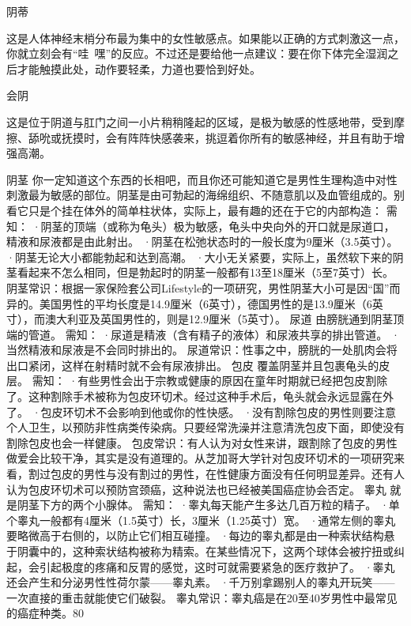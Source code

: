 \documentclass[12pt,UTF8]{ctexbook}
\begin{document}
阴蒂

这是人体神经末梢分布最为集中的女性敏感点。如果能以正确的方式刺激这一点，你就立刻会有“哇~嘿”的反应。不过还是要给他一点建议：要在你下体完全湿润之后才能触摸此处，动作要轻柔，力道也要恰到好处。

会阴

这是位于阴道与肛门之间一小片稍稍隆起的区域，是极为敏感的性感地带，受到摩擦、舔吮或抚摸时，会有阵阵快感袭来，挑逗着你所有的敏感神经，并且有助于增强高潮。


阴茎
你一定知道这个东西的长相吧，而且你还可能知道它是男性生理构造中对性刺激最为敏感的部位。阴茎是由可勃起的海绵组织、不随意肌以及血管组成的。别看它只是个挂在体外的简单柱状体，实际上，最有趣的还在于它的内部构造：
需知：
·阴茎的顶端（或称为龟头）极为敏感，龟头中央向外的开口就是尿道口，精液和尿液都是由此射出。
·阴茎在松弛状态时的一般长度为9厘米（3.5英寸）。
·阴茎无论大小都能勃起和达到高潮。
·大小无关紧要，实际上，虽然软下来的阴茎看起来不怎么相同，但是勃起时的阴茎一般都有13至18厘米（5至7英寸）长。
阴茎常识：根据一家保险套公司Lifestyle的一项研究，男性阴茎大小可是因“国”而异的。美国男性的平均长度是14.9厘米（6英寸），德国男性的是13.9厘米（6英寸），而澳大利亚及英国男性的，则是12.9厘米（5英寸）。
尿道
由膀胱通到阴茎顶端的管道。
需知：
·尿道是精液（含有精子的液体）和尿液共享的排出管道。
·当然精液和尿液是不会同时排出的。
尿道常识：性事之中，膀胱的一处肌肉会将出口紧闭，这样在射精时就不会有尿液排出。
包皮
覆盖阴茎并且包裹龟头的皮层。
需知：
·有些男性会出于宗教或健康的原因在童年时期就已经把包皮割除了。这种割除手术被称为包皮环切术。经过这种手术后，龟头就会永远显露在外了。
·包皮环切术不会影响到他或你的性快感。
·没有割除包皮的男性则要注意个人卫生，以预防非性病类传染病。只要经常洗澡并注意清洗包皮下面，即使没有割除包皮也会一样健康。
包皮常识：有人认为对女性来讲，跟割除了包皮的男性做爱会比较干净，其实是没有道理的。从芝加哥大学针对包皮环切术的一项研究来看，割过包皮的男性与没有割过的男性，在性健康方面没有任何明显差异。还有人认为包皮环切术可以预防宫颈癌，这种说法也已经被美国癌症协会否定。
睾丸
就是阴茎下方的两个小腺体。
需知：
·睾丸每天能产生多达几百万粒的精子。
·单个睾丸一般都有4厘米（1.5英寸）长，3厘米（1.25英寸）宽。
·通常左侧的睾丸要略微高于右侧的，以防止它们相互碰撞。
·每边的睾丸都是由一种索状结构悬于阴囊中的，这种索状结构被称为精索。在某些情况下，这两个球体会被拧扭或纠起，会引起极度的疼痛和反胃的感觉，这时可就需要紧急的医疗救护了。
·睾丸还会产生和分泌男性性荷尔蒙——睾丸素。
·千万别拿踢别人的睾丸开玩笑——一次直接的重击就能使它们破裂。
睾丸常识：睾丸癌是在20至40岁男性中最常见的癌症种类。80%
\end{document}

